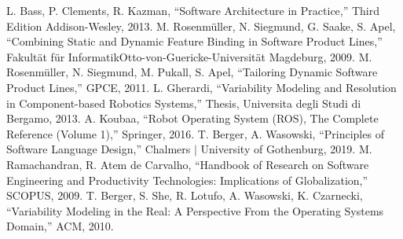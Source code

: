 \documentclass[conference]{IEEEtran}
\begin{document}
\begin{thebibliography}{00}
 L. Bass, P. Clements, R. Kazman, ``Software Architecture in Practice,'' Third Edition Addison-Wesley, 2013.
 M. Rosenmüller, N. Siegmund, G. Saake, S. Apel, ``Combining Static and Dynamic Feature Binding in
Software Product Lines,'' Fakultät für InformatikOtto-von-Guericke-Universität Magdeburg, 2009.
 M. Rosenmüller, N. Siegmund, M. Pukall, S. Apel, ``Tailoring Dynamic Software Product Lines,'' GPCE, 2011.
 L. Gherardi, ``Variability Modeling and Resolution in Component-based Robotics Systems,'' Thesis,  Universita degli Studi di Bergamo, 2013.
 A. Koubaa, ``Robot Operating System (ROS), The Complete Reference (Volume 1),'' Springer, 2016.
 T. Berger, A. Wasowski, ``Principles of Software Language Design,'' Chalmers $|$ University of Gothenburg, 2019.
 M. Ramachandran, R. Atem de Carvalho, ``Handbook of Research on Software Engineering and Productivity Technologies: Implications of Globalization,'' SCOPUS, 2009.
 T. Berger, S. She, R. Lotufo, A. Wasowski, K. Czarnecki, ``Variability Modeling in the Real: A Perspective From the Operating Systems Domain,'' ACM, 2010.
\end{thebibliography}
\vspace{12pt}
\end{document}

